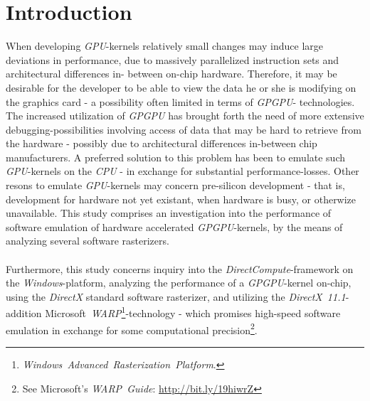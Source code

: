 \documentclass[fleqn,10pt]{SelfArx} %
\affiliation{EricNNilsson@gmail.com}
\newlength{\tocsep}
\begin{document}
\flushbottom %
\maketitle %
\thispagestyle{empty} %

\section*{Introduction} %
\label{sec:introduction}
When developing \textit{GPU}-kernels relatively small changes may induce large deviations in performance, due to massively parallelized instruction sets and architectural differences in-
between on-chip hardware. Therefore, it may be desirable for the developer to be able to view the data he or she is modifying on the graphics card - a possibility often limited in terms of \textit{GPGPU}-
technologies.\\
The increased utilization of \textit{GPGPU} has brought forth the need of more extensive debugging-possibilities involving access of data that may be hard to retrieve from the hardware - possibly due to architectural differences in-between chip manufacturers. A preferred solution to this problem has been to emulate such \textit{GPU}-kernels on the \textit{CPU} - in exchange for substantial performance-losses. Other resons to emulate \textit{GPU}-kernels may concern pre-silicon development - that is, development for hardware not yet existant, when hardware is busy, or otherwize unavailable. This study comprises an investigation into the performance of software emulation of hardware accelerated \textit{GPGPU}-kernels, by the means of analyzing several software rasterizers.\\
\\
Furthermore, this study concerns inquiry into the \textit{DirectCompute}-framework on the \textit{Windows}-platform, analyzing the performance of a \textit{GPGPU}-kernel on-chip, using the \textit{DirectX} standard software rasterizer, and utilizing the \textit{DirectX~11.1}-addition Microsoft~\textit{WARP}\footnote{\textit{Windows~Advanced~Rasterization~Platform}.}-technology - which promises high-speed software emulation in exchange for some computational precision\footnote{See Microsoft's \textit{WARP~Guide}: \url{http://bit.ly/19hiwrZ}}. \\
\end{document}
